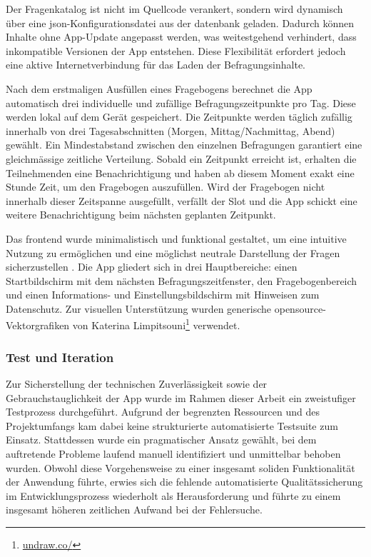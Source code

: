 Der Fragenkatalog ist nicht im Quellcode verankert, sondern wird dynamisch über eine \gls{json}-Konfigurationsdatei aus der \gls{datenbank} geladen. Dadurch können Inhalte ohne App-Update angepasst werden, was weitestgehend verhindert, dass inkompatible Versionen der App entstehen. Diese Flexibilität erfordert jedoch eine aktive Internetverbindung für das Laden der Befragungsinhalte.

Nach dem erstmaligen Ausfüllen eines Fragebogens berechnet die App automatisch drei individuelle und zufällige Befragungszeitpunkte pro Tag. Diese werden lokal auf dem Gerät gespeichert. Die Zeitpunkte werden täglich zufällig innerhalb von drei Tagesabschnitten (Morgen, Mittag/Nachmittag, Abend) gewählt. Ein Mindestabstand zwischen den einzelnen Befragungen garantiert eine gleichmässige zeitliche Verteilung. Sobald ein Zeitpunkt erreicht ist, erhalten die Teilnehmenden eine Benachrichtigung und haben ab diesem Moment exakt eine Stunde Zeit, um den Fragebogen auszufüllen. Wird der Fragebogen nicht innerhalb dieser Zeitspanne ausgefüllt, verfällt der Slot und die App schickt eine weitere Benachrichtigung beim nächsten geplanten Zeitpunkt.

Das \gls{frontend} wurde minimalistisch und funktional gestaltet, um eine intuitive Nutzung zu ermöglichen und eine möglichst neutrale Darstellung der Fragen sicherzustellen \parencite{rogersInteractionDesignHumancomputer2023}. Die App gliedert sich in drei Hauptbereiche: einen Startbildschirm mit dem nächsten Befragungszeitfenster, den Fragebogenbereich und einen Informations- und Einstellungsbildschirm mit Hinweisen zum Datenschutz. Zur visuellen Unterstützung wurden generische \gls{opensource}-Vektorgrafiken von Katerina Limpitsouni\footnote{\href{https://undraw.co/}{undraw.co/}} verwendet.


\subsubsection{Test und Iteration}
Zur Sicherstellung der technischen Zuverlässigkeit sowie der Gebrauchstauglichkeit der App wurde im Rahmen dieser Arbeit ein zweistufiger Testprozess durchgeführt. Aufgrund der begrenzten Ressourcen und des Projektumfangs kam dabei keine strukturierte automatisierte Testsuite zum Einsatz. Stattdessen wurde ein pragmatischer Ansatz gewählt, bei dem auftretende Probleme laufend manuell identifiziert und unmittelbar behoben wurden. Obwohl diese Vorgehensweise zu einer insgesamt soliden Funktionalität der Anwendung führte, erwies sich die fehlende automatisierte Qualitätssicherung im Entwicklungsprozess wiederholt als Herausforderung und führte zu einem insgesamt höheren zeitlichen Aufwand bei der Fehlersuche.

